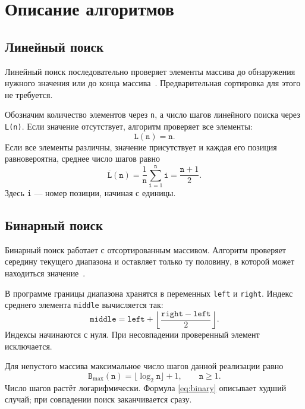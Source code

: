 \section{Описание алгоритмов}
\subsection{Линейный поиск}
Линейный поиск последовательно проверяет элементы массива до обнаружения
нужного значения или до конца массива~\cite{linear}. Предварительная
сортировка для этого не требуется.

Обозначим количество элементов через \texttt{n}, а число шагов линейного
поиска через \texttt{L(n)}. Если значение отсутствует, алгоритм проверяет
все элементы:
\begin{equation}
\mathtt{L}(\mathtt{n})=\mathtt{n}.
\label{eq:linear}
\end{equation}
Если все элементы различны, значение присутствует и каждая его позиция
равновероятна, среднее число шагов равно
\begin{equation}
\overline{\mathtt{L}}(\mathtt{n})=
\frac{1}{\mathtt{n}}\sum_{\mathtt{i}=1}^{\mathtt{n}}\mathtt{i}
=\frac{\mathtt{n}+1}{2}.
\label{eq:average}
\end{equation}
Здесь \texttt{i} --- номер позиции, начиная с единицы.

\subsection{Бинарный поиск}
Бинарный поиск работает с отсортированным массивом. Алгоритм проверяет
середину текущего диапазона и оставляет только ту половину, в которой
может находиться значение~\cite{binary}.

В программе границы диапазона хранятся в переменных \texttt{left}
и \texttt{right}. Индекс среднего элемента \texttt{middle} вычисляется так:
\begin{equation}
\mathtt{middle}=\mathtt{left}+
\left\lfloor\frac{\mathtt{right}-\mathtt{left}}{2}\right\rfloor.
\label{eq:middle}
\end{equation}
Индексы начинаются с нуля. При несовпадении проверенный элемент исключается.

Для непустого массива максимальное число шагов данной реализации равно
\begin{equation}
\mathtt{B}_{\max}(\mathtt{n})=
\lfloor\log_2\mathtt{n}\rfloor+1,\qquad \mathtt{n}\geq 1.
\label{eq:binary}
\end{equation}
Число шагов растёт логарифмически. Формула \eqref{eq:binary}
описывает худший случай; при совпадении поиск заканчивается сразу.

